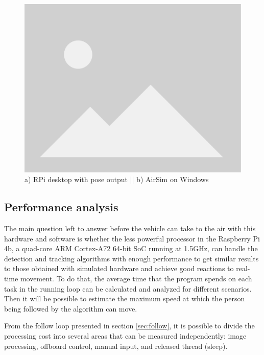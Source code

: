 \begin{figure}
  \centering
  \includegraphics[width=.8\textwidth, keepaspectratio]{img/placeholder.png}
  \caption{a) RPi desktop with pose output || b) AirSim on Windows}
  \label{fig:rpi-airsim-test}
\end{figure}

\subsection{Performance analysis}
\label{subsec:performance}

The main question left to answer before the vehicle can take to the air with this hardware and software is whether the less powerful processor in the Raspberry Pi 4b, a quad-core ARM Cortex-A72 64-bit SoC running at 1.5GHz, can handle the detection and tracking algorithms with enough performance to get similar results to those obtained with simulated hardware and achieve good reactions to real-time movement.
To do that, the average time that the program spends on each task in the running loop can be calculated and analyzed for different scenarios.
Then it will be possible to estimate the maximum speed at which the person being followed by the algorithm can move.

From the follow loop presented in section \ref{sec:follow}, it is possible to divide the processing cost into several areas that can be measured independently: image processing, offboard control, manual input, and released thread (sleep).

